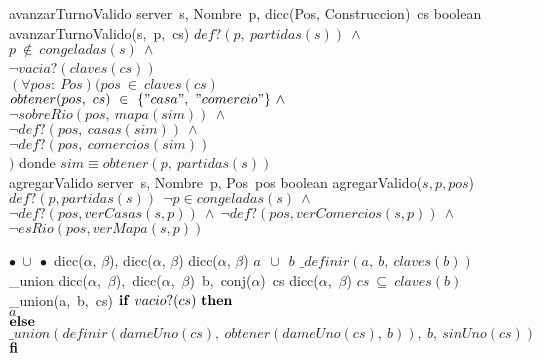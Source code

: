 \tadOperacion
    {avanzarTurnoValido}
    {server\ s, Nombre\ p, dicc(Pos, Construccion)\ cs}
    {boolean}
    {}
\tadAxioma
    {avanzarTurnoValido(s,\ p,\ cs)}
    {$
        def?(p,\ partidas(s))\ \land\ $\\$
        p\ \notin\ congeladas(s)\ \land\ $\\$ 
        \neg vacia?(claves(cs))\ $\yluego\ \\$
        (\forall pos:\ Pos)(pos\ \in\ claves(cs)\ $\impluego$ $\\$
            $\tab$ obtener(pos,\ cs)\ \in\ \{"casa",\ "comercio"\}\ \land\ $\\$
            $\tab$ \neg sobreRio(pos,\ mapa(sim))\ \land\ $\\$
            $\tab$ \neg def?(pos,\ casas(sim))\ \land\ $\\$
            $\tab$ \neg def?(pos,\ comercios(sim)) $\\$
        )
    $}
\tab donde $sim \equiv obtener(p,\ partidas(s))$  
\\
\tadOperacion
    {agregarValido}
    {server\ s, Nombre\ p, Pos\ pos}
    {boolean}
    {}
\tadAxioma
    {agregarValido($s, p, pos$)}
    {$
        def?(p, partidas(s))\ $\yluego$\ \lnot p \in congeladas(s)\ \wedge\ $\\$
        \lnot def?(pos, verCasas(s, p))\ \wedge\ \lnot def?(pos, verComercios(s, p))\ \wedge\ $\\$
        \lnot esRio(pos, verMapa(s, p)) $\\$
$}

\tadOperacion
    {$\bullet\ \cup\ \bullet$}
    {dicc($\alpha$, $\beta$), dicc($\alpha$, $\beta$)}
    {dicc($\alpha$, $\beta$)}
    {}
\tadAxioma
    {$a\ \ \cup\ \ b$}
    {$ \_definir(a,\ b,\ claves(b))$}
\vspace{4mm}
\tadOperacion
    {\_union}
    {dicc($\alpha$,\ $\beta$),\ dicc($\alpha$,\ $\beta$)\ b,\ conj($\alpha$)\ cs}
    {dicc($\alpha$,\ $\beta$)}
    {$cs\ \subseteq\ claves(b)$}
\tadAxioma
    {\_union(a,\ b,\ cs)}
    {$ 
    \LIF\ vacio?(cs)\ \LTHEN\ $\\$ 
    $\tab$ a $\\$
    \textrm{\textbf{else}} $\\$ 
    $\tab$ \_union(definir(dameUno(cs),\ obtener(dameUno(cs),\ b)),\ b,\ sinUno(cs)) $\\$ 
    \textrm{\textbf{fi}}
    $}